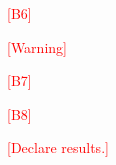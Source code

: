 \documentclass[prl,aps,reprint,twocolumn,10pt,superscriptaddress,floatfix]{revtex4-2}
\newcommand{\tmp}[1]{\textcolor{red}{#1}}
\begin{document}
%

\tmp{[B6]}

\tmp{[Warning]}

\tmp{[B7]}

\tmp{[B8]}

\tmp{[Declare results.]}


\end{document}

